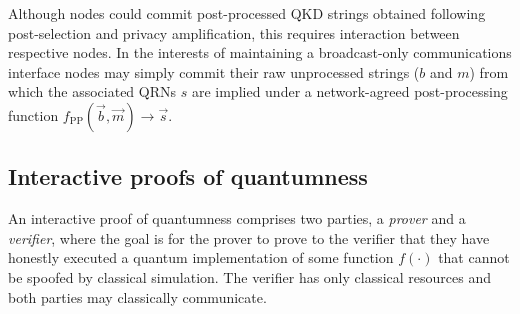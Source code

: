 \documentclass[twocolumn, aps, amsmath, amssymb, nofootinbib, superscriptaddress, longbibliography, floatfix, eqsecnum, rmp]{revtex4-2}
\begin{document}
Although nodes could commit post-processed QKD strings obtained following post-selection and privacy amplification, this requires interaction between respective nodes. In the interests of maintaining a broadcast-only communications interface nodes may simply commit their raw unprocessed strings ($b$ and $m$) from which the associated QRNs $s$ are implied under a network-agreed post-processing function $f_\mathrm{PP}(\vec{b},\vec{m})\to \vec{s}$. 

\subsection{Interactive proofs of quantumness} \label{sec:IPQ}



%

An interactive proof of quantumness \cite{Liu22, Zhu23} comprises two parties, a \emph{prover} and a \emph{verifier}, where the goal is for the prover to prove to the verifier that they have honestly executed a quantum implementation of some function $f(\cdot)$ that cannot be spoofed by classical simulation. The verifier has only classical resources and both parties may classically communicate.
\end{document}

